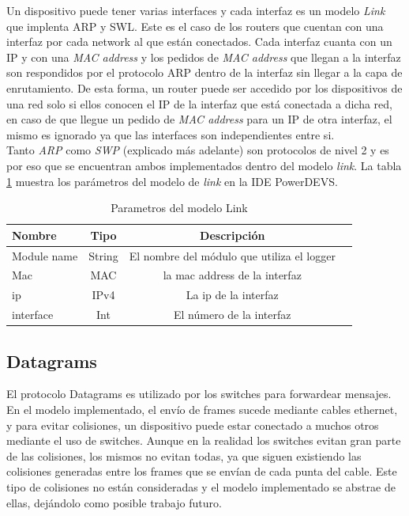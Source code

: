 \documentclass[10pt,a4paper]{article}
\begin{document}
Un dispositivo puede tener varias interfaces y cada interfaz es un modelo \textit{Link} que implenta ARP y SWL. Este es el caso de los routers que cuentan con una interfaz por cada network al que están conectados. Cada interfaz cuanta con un IP y con una \textit{MAC address} y los pedidos de \textit{MAC address} que llegan a la interfaz son respondidos por el protocolo ARP dentro de la interfaz sin llegar a la capa de enrutamiento. De esta forma, un router puede ser accedido por los dispositivos de una red solo si ellos conocen el IP de la interfaz que está conectada a dicha red, en caso de que llegue un pedido de \textit{MAC address} para un IP de otra interfaz, el mismo es ignorado ya que las interfaces son independientes entre si. \\

Tanto \textit{ARP} como \textit{SWP} (explicado más adelante) son protocolos de nivel 2 y es por eso que se encuentran ambos implementados dentro del modelo \textit{link}. La tabla \ref{table: parameters link} muestra los parámetros del modelo de \textit{link} en la IDE PowerDEVS. 

\begin{table}[h]
\begin{tabular}{|l|c|c|c|}
  \hline
  \textbf{Nombre} & \textbf{Tipo} & \textbf{Descripción} \\
  \hline
  Module name & String & El nombre del módulo que utiliza el logger \\
  \hline
  Mac & MAC & la mac address de la interfaz \\
  \hline
  ip & IPv4 & La ip de la interfaz \\
  \hline
  interface & Int & El número de la interfaz \\
  \hline
\end{tabular}
\caption{Parametros del modelo Link}
\label{table: parameters link}
\end{table}

\newpage

\subsection{Datagrams}
El protocolo Datagrams es utilizado por los switches para forwardear mensajes. \\

En el modelo implementado, el envío de frames sucede mediante cables ethernet, y para evitar colisiones, un dispositivo puede estar conectado a muchos otros mediante el uso de switches. Aunque en la realidad los switches evitan gran parte de las colisiones, los mismos no evitan todas, ya que siguen existiendo las colisiones generadas entre los frames que se envían de cada punta del cable. Este tipo de colisiones no están consideradas y el modelo implementado se abstrae de ellas, dejándolo como posible trabajo futuro. \\
\end{document}
